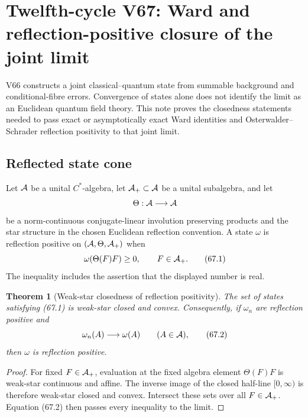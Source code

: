 \documentclass[11pt]{article}
\newtheorem{theorem}{Theorem}[section]
\theoremstyle{remark}
\begin{document}

\section{Twelfth-cycle V67: Ward and reflection-positive closure of
the joint limit}
\label{sec:v12v67}

V66 constructs a joint classical--quantum state from summable
background and conditional-fibre errors.  Convergence of states
alone does not identify the limit as an Euclidean quantum field
theory.  This note proves the closedness statements needed to pass
exact or asymptotically exact Ward identities and
Osterwalder--Schrader reflection positivity to that joint limit.

\subsection{Reflected state cone}

Let \({\cal A}\) be a unital \(C^*\)-algebra, let
\({\cal A}_+\subset{\cal A}\) be a unital subalgebra, and let
\[
 \Theta:{\cal A}\longrightarrow{\cal A}
\]
be a norm-continuous conjugate-linear involution preserving products
and the star structure in the chosen Euclidean reflection
convention.  A state \(\omega\) is reflection positive on
\(({\cal A},\Theta,{\cal A}_+)\) when
\begin{equation}
 \omega(\Theta(F)F)\geq0,\qquad F\in{\cal A}_+.    \tag{67.1}
\end{equation}
The inequality includes the assertion that the displayed number is
real.

\begin{theorem}[Weak-star closedness of reflection positivity]
\label{thm:v12v67-OS-closed}
The set of states satisfying (67.1) is weak-star closed and convex.
Consequently, if \(\omega_n\) are reflection positive and
\[
                         \omega_n(A)\longrightarrow\omega(A)
 \qquad(A\in{\cal A}),                            \tag{67.2}
\]
then \(\omega\) is reflection positive.
\end{theorem}

\begin{proof}
For fixed \(F\in{\cal A}_+\), evaluation at the fixed algebra element
\(\Theta(F)F\) is weak-star continuous and affine.  The inverse image
of the closed half-line \([0,\infty)\) is therefore weak-star closed
and convex.  Intersect these sets over all \(F\in{\cal A}_+\).
Equation (67.2) then passes every inequality to the limit.
\end{proof}
\end{document}
